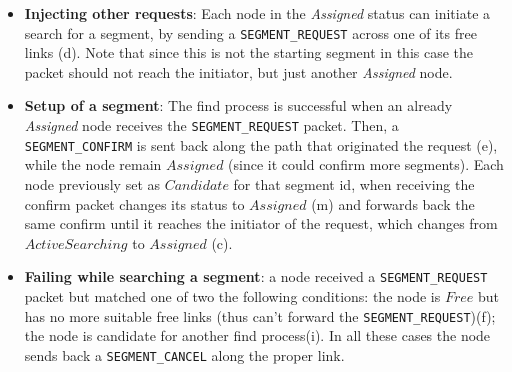\begin{itemize}
\item{\textbf{Injecting other requests}}: Each node in the
\emph{Assigned} status can initiate a search for a segment, by sending
a \texttt{SEGMENT\_REQUEST} across one of its free links (d). Note
that since this is not the starting segment in this case the packet
should not reach the initiator, but just another \emph{Assigned} node.

\item{\textbf{Setup of a segment}}: The find process is successful
when an already \emph{Assigned} node receives the
\texttt{SEGMENT\_REQUEST} packet. Then, a \texttt{SEGMENT\_CONFIRM} is
sent back along the path that originated the request (e), while the
node remain $Assigned$ (since it could confirm more segments). Each node
previously set as $Candidate$ for that segment id, when receiving the
confirm packet changes its status to $Assigned$ (m) and forwards back
the same confirm until it reaches the initiator of the request, which
changes from $ActiveSearching$ to $Assigned$ (c).

\item{\textbf{Failing while searching a segment}}: a node received a \texttt{SEGMENT\_REQUEST} packet but
matched one of two the following conditions: the node is $Free$ but has no
more suitable free links (thus can’t forward the
\texttt{SEGMENT\_REQUEST})(f); the node
is candidate for another find process(i).  In all these cases the node
sends back a \texttt{SEGMENT\_CANCEL} along the proper link. 
\end{itemize}


